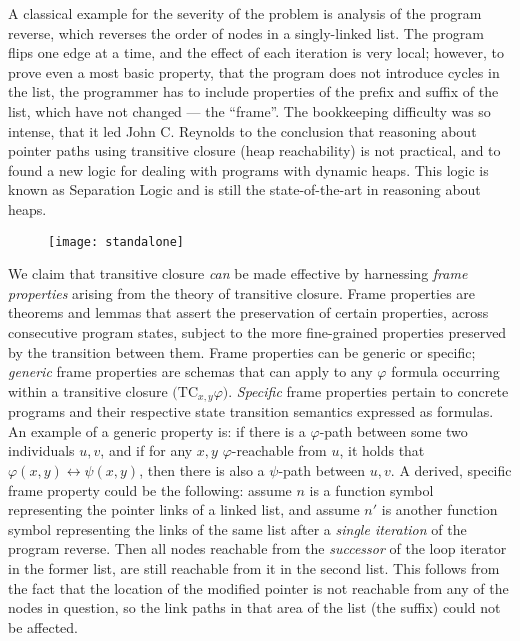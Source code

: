 A classical example for the severity of the problem is analysis of the program
\textsf{reverse}, which reverses the order of nodes in a singly-linked list.
The program flips one edge at a time, and the effect of each iteration is
very local; however, to prove even a most basic property, that the program does
not introduce cycles in the list, the programmer has to include properties of
the prefix and suffix of the list, which have not changed --- the ``frame''.
The bookkeeping difficulty was so intense, that it led John C. Reynolds to the
conclusion that reasoning about pointer paths using transitive closure (heap
reachability) is not practical, and to found a new logic for dealing with
programs with dynamic heaps.
This logic is known as Separation Logic and is still the state-of-the-art in
reasoning about heaps.

\begin{figure}
\texttt{[image: standalone]}
\end{figure}

We claim that transitive closure \emph{can} be made effective by harnessing
\emph{frame properties} arising from the theory of transitive closure.
Frame properties are theorems and lemmas that assert the preservation of
certain properties, across consecutive program states, subject to the more
fine-grained properties preserved by the transition between them.
Frame properties can be generic or specific; \emph{generic} frame properties are
schemas that can apply to any $\varphi$ formula occurring within a transitive
closure $\big(\mathrm{TC}_{x,y}\varphi\big)$.
\emph{Specific} frame properties pertain to concrete programs and their respective
state transition semantics expressed as formulas.
An example of a generic property is: if there is a $\varphi$-path between some
two individuals $u, v$, and if for any $x,y$ $\varphi$-reachable from $u$, it
holds that $\varphi(x,y) \leftrightarrow \psi(x,y)$, then there is also a
$\psi$-path between $u, v$.
A derived, specific frame property could be the following: assume $n$ is a
function symbol representing the pointer links of a linked list, and assume
$n'$ is another function symbol representing the links of the same list after
a \emph{single iteration} of the program \textsf{reverse}.
Then all nodes reachable from the \emph{successor} of the loop iterator in the
former list, are still reachable from it in the second list.
This follows from the fact that the location of the modified pointer is not
reachable from any of the nodes in question, so the link paths in that area of
the list (the suffix) could not be affected.

